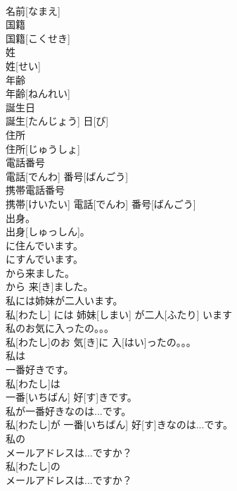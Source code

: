 \documentclass[8pt]{extreport}
\begin{document}
\begin{CJK}{UTF8}{min}
\\	名前[なまえ]	
\\	国籍 
\\	国籍[こくせき]	
\\	姓
\\	姓[せい]	
\\	年齢 
\\	年齢[ねんれい]	
\\	誕生日 
\\	誕生[たんじょう] 日[び]	
\\	住所
\\	住所[じゅうしょ]	
\\	電話番号 
\\	電話[でんわ] 番号[ばんごう]	
\\	携帯電話番号
\\	携帯[けいたい] 電話[でんわ] 番号[ばんごう]	
\\	出身。 
\\	出身[しゅっしん]。	
\\	に住んでいます。 
\\	にすんでいます。	
\\	から来ました。 
\\	から 来[き]ました。	
\\	私には姉妹が二人います。 
\\	私[わたし] には 姉妹[しまい] が二人[ふたり] います	
\\	私のお気に入ったの。。。 
\\	私[わたし]のお 気[き]に 入[はい]ったの。。。	
\\	私は
\\	一番好きです。 
\\	私[わたし]は
\\	一番[いちばん] 好[す]きです。	
\\	私が一番好きなのは...です。 
\\	私[わたし]が 一番[いちばん] 好[す]きなのは...です。	
\\	私の
\\	メールアドレスは...ですか？
\\	私[わたし]の
\\	メールアドレスは...ですか？	
\end{CJK}
\end{document}
